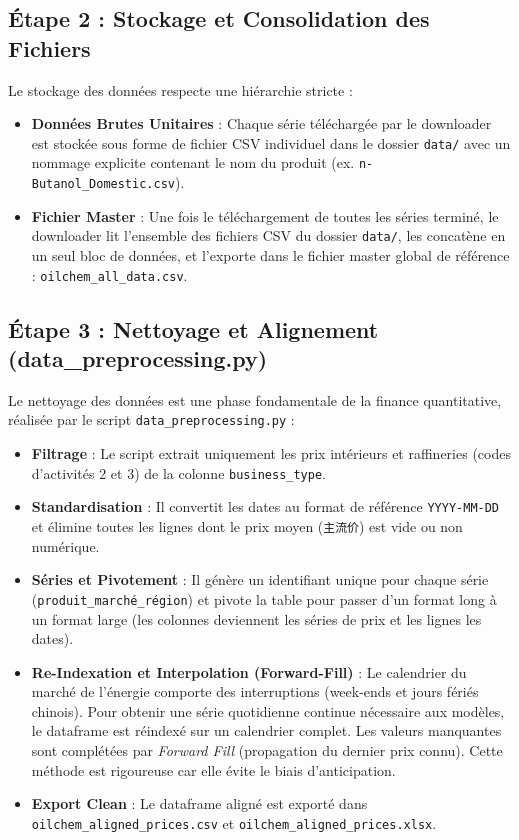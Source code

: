 \documentclass[12pt,a4paper]{article}
\begin{document}
\subsection{Étape 2 : Stockage et Consolidation des Fichiers}
Le stockage des données respecte une hiérarchie stricte :
\begin{itemize}
    \item \textbf{Données Brutes Unitaires} : Chaque série téléchargée par le downloader est stockée sous forme de fichier CSV individuel dans le dossier \texttt{data/} avec un nommage explicite contenant le nom du produit (ex. \texttt{n-Butanol\_Domestic.csv}).
    \item \textbf{Fichier Master} : Une fois le téléchargement de toutes les séries terminé, le downloader lit l'ensemble des fichiers CSV du dossier \texttt{data/}, les concatène en un seul bloc de données, et l'exporte dans le fichier master global de référence : \texttt{oilchem\_all\_data.csv}.
\end{itemize}

\subsection{Étape 3 : Nettoyage et Alignement (data\_preprocessing.py)}
Le nettoyage des données est une phase fondamentale de la finance quantitative, réalisée par le script \texttt{data\_preprocessing.py} :
\begin{itemize}
    \item \textbf{Filtrage} : Le script extrait uniquement les prix intérieurs et raffineries (codes d'activités 2 et 3) de la colonne \texttt{business\_type}.
    \item \textbf{Standardisation} : Il convertit les dates au format de référence \texttt{YYYY-MM-DD} et élimine toutes les lignes dont le prix moyen (\texttt{主流价}) est vide ou non numérique.
    \item \textbf{Séries et Pivotement} : Il génère un identifiant unique pour chaque série (\texttt{produit\_marché\_région}) et pivote la table pour passer d'un format long à un format large (les colonnes deviennent les séries de prix et les lignes les dates).
    \item \textbf{Re-Indexation et Interpolation (Forward-Fill)} : Le calendrier du marché de l'énergie comporte des interruptions (week-ends et jours fériés chinois). Pour obtenir une série quotidienne continue nécessaire aux modèles, le dataframe est réindexé sur un calendrier complet. Les valeurs manquantes sont complétées par \textit{Forward Fill} (propagation du dernier prix connu). Cette méthode est rigoureuse car elle évite le biais d'anticipation.
    \item \textbf{Export Clean} : Le dataframe aligné est exporté dans \texttt{oilchem\_aligned\_prices.csv} et \texttt{oilchem\_aligned\_prices.xlsx}.
\end{itemize}
\end{document}

